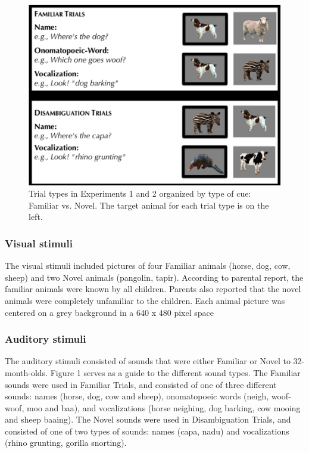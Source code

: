 \documentclass[english,floatsintext,man]{apa6}
\theoremstyle{definition}
\theoremstyle{definition}
\theoremstyle{definition}
\theoremstyle{remark}
\begin{document}
\begin{figure}[tb]
\includegraphics[width=0.95\linewidth]{anime_manuscript_files/figure-latex/stimuli-e1-1} \caption{Trial types in Experiments 1 and 2 organized by type of cue: Familiar vs. Novel. The target animal for each trial type is on the left.}\label{fig:stimuli-e1}
\end{figure}

\subsubsection{Visual stimuli}\label{visual-stimuli}

The visual stimuli included pictures of four Familiar animals (horse,
dog, cow, sheep) and two Novel animals (pangolin, tapir). According to
parental report, the familiar animals were known by all children.
Parents also reported that the novel animals were completely unfamiliar
to the children. Each animal picture was centered on a grey background
in a 640 x 480 pixel space

\subsubsection{Auditory stimuli}\label{auditory-stimuli}

The auditory stimuli consisted of sounds that were either Familiar or
Novel to 32-month-olds. Figure 1 serves as a guide to the different
sound types. The Familiar sounds were used in Familiar Trials, and
consisted of one of three different sounds: names (horse, dog, cow and
sheep), onomatopoeic words (neigh, woof-woof, moo and baa), and
vocalizations (horse neighing, dog barking, cow mooing and sheep
baaing). The Novel sounds were used in Disambiguation Trials, and
consisted of one of two types of sounds: names (capa, nadu) and
vocalizations (rhino grunting, gorilla snorting).
\end{document}
